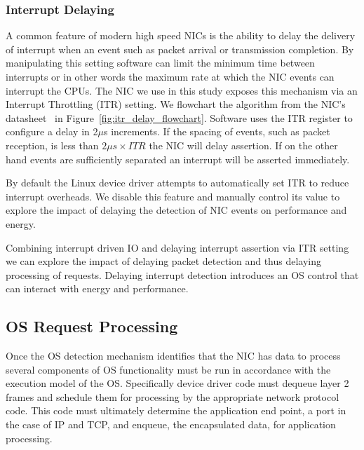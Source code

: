 \subsubsection{Interrupt Delaying}
\label{sec:workflow:itrdelay}

A common feature of modern high speed NICs is the ability to delay the delivery of interrupt when an event such as packet arrival or transmission completion. By manipulating this setting software can limit the minimum time between interrupts or in other words the maximum rate at which the NIC events can interrupt the CPUs. The NIC we use in this study exposes this mechanism via an Interrupt Throttling (ITR) setting.  We flowchart the algorithm from the NIC's datasheet~\cite{82599} in  Figure~\ref{fig:itr_delay_flowchart}. Software uses the ITR register to configure a delay in 2$\mu$s increments.  If the spacing of events, such as packet reception, is less than  $2{\mu}s \times ITR$ the NIC will delay assertion.  If on the other hand events are sufficiently separated an interrupt will be asserted immediately.   

By default the Linux device driver attempts to automatically set ITR to reduce interrupt overheads.  We disable this feature and manually control its value to explore the impact of delaying the detection of NIC events on performance and energy.

Combining interrupt driven IO and delaying interrupt assertion via ITR setting we can explore the impact of delaying packet detection and thus delaying processing of requests.  %
Delaying interrupt detection introduces an OS control that can interact with energy and performance. 


\subsection{OS Request Processing}
\label{sec:workflow:osreqproc}

Once the OS detection mechanism identifies that the NIC has data to process several components of OS functionality must be run in accordance with the execution model of the OS.  Specifically device driver code must dequeue layer 2 frames and schedule them for processing by the appropriate network protocol code. This code must ultimately determine the application end point, a port in the case of IP and TCP, and enqueue, the encapsulated data,  for application processing. 

